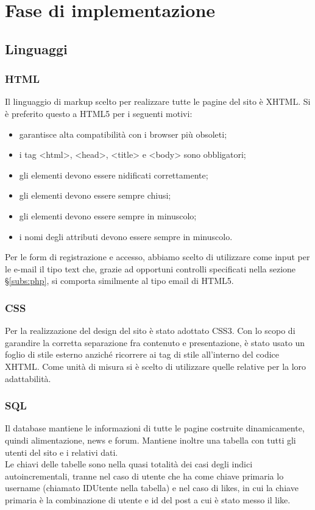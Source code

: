 \section{Fase di implementazione}
\subsection{Linguaggi}
\subsubsection{HTML}
Il linguaggio di markup scelto per realizzare tutte le pagine del sito è XHTML. Si è preferito questo a HTML5 per i seguenti motivi:
\begin{itemize}
    \item garantisce alta compatibilità con i browser più obsoleti;
    \item i tag <html>, <head>, <title> e <body> sono obbligatori;
	\item gli elementi devono essere nidificati correttamente;
	\item gli elementi devono essere sempre chiusi;
	\item gli elementi devono essere sempre in minuscolo;
	\item i nomi degli attributi devono essere sempre in minuscolo.
\end{itemize}

Per le form di registrazione e accesso, abbiamo scelto di utilizzare come input per le e-mail il tipo text che, grazie ad opportuni controlli specificati nella sezione \S\ref{subs:php}, 
si comporta similmente al tipo email di HTML5.

\subsubsection{CSS}
Per la realizzazione del design del sito è stato adottato CSS3. 
Con lo scopo di garandire la corretta separazione fra contenuto e presentazione, è stato usato un foglio di stile esterno anziché ricorrere ai tag di stile all'interno del codice XHTML. 
Come unità di misura si è scelto di utilizzare quelle relative per la loro adattabilità.
\subsubsection{SQL}

Il database mantiene le informazioni di tutte le pagine costruite dinamicamente, quindi alimentazione, news e forum. Mantiene inoltre una tabella con tutti gli utenti del sito e i relativi dati.\\
Le chiavi delle tabelle sono nella quasi totalità dei casi degli indici autoincrementali, tranne nel caso di utente che ha come chiave primaria lo username (chiamato IDUtente nella tabella) e nel caso di likes, in cui la chiave primaria è 
la combinazione di utente e id del post a cui è stato messo il like.

